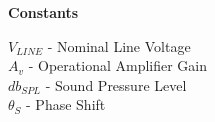 \clearpage

\listoffigures
\listoftables

\clearpage


\begin{homeworkProblem}[{Nomenclature}]
\textbf{Constants}

\(V_{LINE}\) - Nominal Line Voltage\\
\(A_v\) - Operational Amplifier Gain\\
\(db_{SPL}\) - Sound Pressure Level\\
\(\theta_S\) - Phase Shift

\end{homeworkProblem}

